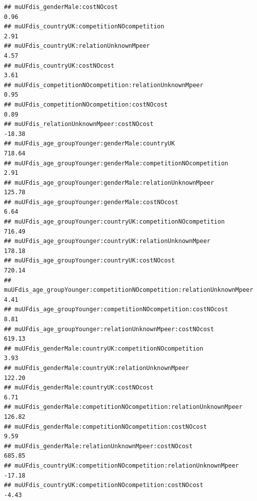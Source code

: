 \documentclass[
]{article}
\begin{document}
\begin{verbatim}
## muUFdis_genderMale:costNOcost                                                                    0.96
## muUFdis_countryUK:competitionNOcompetition                                                       2.91
## muUFdis_countryUK:relationUnknownMpeer                                                           4.57
## muUFdis_countryUK:costNOcost                                                                     3.61
## muUFdis_competitionNOcompetition:relationUnknownMpeer                                            0.95
## muUFdis_competitionNOcompetition:costNOcost                                                      0.89
## muUFdis_relationUnknownMpeer:costNOcost                                                        -18.38
## muUFdis_age_groupYounger:genderMale:countryUK                                                  718.64
## muUFdis_age_groupYounger:genderMale:competitionNOcompetition                                     2.91
## muUFdis_age_groupYounger:genderMale:relationUnknownMpeer                                       125.78
## muUFdis_age_groupYounger:genderMale:costNOcost                                                   6.64
## muUFdis_age_groupYounger:countryUK:competitionNOcompetition                                    716.49
## muUFdis_age_groupYounger:countryUK:relationUnknownMpeer                                        178.18
## muUFdis_age_groupYounger:countryUK:costNOcost                                                  720.14
## muUFdis_age_groupYounger:competitionNOcompetition:relationUnknownMpeer                           4.41
## muUFdis_age_groupYounger:competitionNOcompetition:costNOcost                                     8.81
## muUFdis_age_groupYounger:relationUnknownMpeer:costNOcost                                       619.13
## muUFdis_genderMale:countryUK:competitionNOcompetition                                            3.93
## muUFdis_genderMale:countryUK:relationUnknownMpeer                                              122.20
## muUFdis_genderMale:countryUK:costNOcost                                                          6.71
## muUFdis_genderMale:competitionNOcompetition:relationUnknownMpeer                               126.82
## muUFdis_genderMale:competitionNOcompetition:costNOcost                                           9.59
## muUFdis_genderMale:relationUnknownMpeer:costNOcost                                             685.85
## muUFdis_countryUK:competitionNOcompetition:relationUnknownMpeer                                -17.18
## muUFdis_countryUK:competitionNOcompetition:costNOcost                                           -4.43

\end{verbatim}
\end{document}
